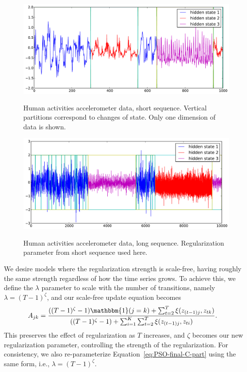 \documentclass[letterpaper]{article}
\begin{document}
\begin{figure}[htbp]
  \caption{Human activities accelerometer data, short sequence. Vertical partitions correspond to changes of state. Only one dimension of data is shown.}
  \centering
    \includegraphics[width=0.8\linewidth]{images/MAP_results_hard_activity_short_3_states.pdf}
    \label{fig:short-real-data}
\end{figure}

\begin{figure}[htbp]
  \caption{Human activities accelerometer data, long sequence. Regularization parameter from short sequence used here.}
  \centering
    \includegraphics[width=0.8\linewidth]{images/MAP_results_hard_activity_long_3_states.pdf}
    \label{fig:long-real-data}
\end{figure}

We desire models where the regularization strength is scale-free, having roughly the same strength regardless of how the time series grows. To achieve this, we define the $\lambda$ parameter to scale with the number of transitions, namely $\lambda = (T-1)^\zeta$, and our scale-free update equation becomes
\begin{align}\label{eq:SCALE-FREE-MAP}
    A_{jk} &= \frac{((T - 1)^{\zeta}-1){\mathbbm{1}(j = k)} + \sum_{t=2}^{T} \xi(z_{(t-1)j}, z_{tk})}   
    {((T - 1)^{\zeta} - 1) + \sum_{i=1}^{K}\sum_{t=2}^{T} \xi(z_{(t-1)j}, z_{ti})}.
\end{align}
This preserves the effect of regularization as $T$ increases, and $\zeta$ becomes our new regularization parameter, controlling the strength of the regularization. For consistency, we also re-parameterize Equation~\ref{eq:PSO-final-C-part} using the same form, i.e., $\lambda = (T-1)^\zeta$.
\end{document}
